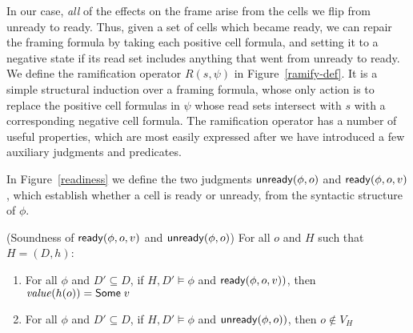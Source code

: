 In our case, \emph{all} of the effects on the frame arise from the
cells we flip from unready to ready. Thus, given a set of cells which
became ready, we can repair the framing formula by taking each
positive cell formula, and setting it to a negative state if its read
set includes anything that went from unready to ready. We define the
ramification operator $R(s, \psi)$ in Figure~\ref{ramify-def}.  It is
a simple structural induction over a framing formula, whose only
action is to replace the positive cell formulas in $\psi$ whose read
sets intersect with $s$ with a corresponding negative cell formula.
The ramification operator has a number of useful properties, which are
most easily expressed after we have introduced a few auxiliary
judgments and predicates.

In Figure~\ref{readiness} we define the two judgments $\mathsf{unready}({\phi}, {o})$
and $\mathsf{ready}({\phi}, {o}, {v})$, which establish whether a cell is ready or
unready, from the syntactic structure of $\phi$. 

\begin{prop}{(Soundness of $\mathsf{ready}({\phi}, {o}, {v})$ and $\mathsf{unready}({\phi}, {o})$)}
For all $o$ and $H$ such that $H = (D,h)$:

\begin{enumerate}
\item For all $\phi$ and $D' \subseteq D$, if $H, D' \models \phi$ and $\mathsf{ready}({\phi}, {o}, {v}))$, then $\mathit{value}(h(o)) = \mathsf{Some}\;v$
\item For all $\phi$ and $D' \subseteq D$, if $H, D' \models \phi$ and $\mathsf{unready}({\phi}, {o}))$, then $o \not\in V_H$
\end{enumerate}
\end{prop}

